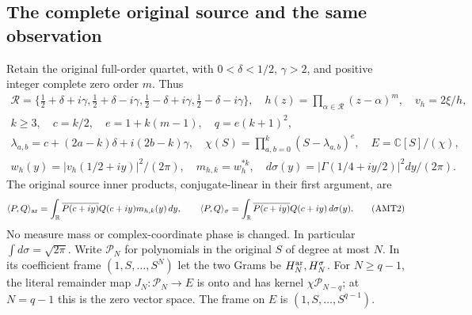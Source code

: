 \documentclass[11pt,a4paper]{article}
\begin{document}
\subsection{The complete original source and the same observation}
Retain the original full-order quartet, with $0<\delta<1/2$,
$\gamma>2$, and positive integer complete zero order $m$. Thus
\[
\begin{gathered}
 \mathcal R=\{\tfrac12+\delta+i\gamma,\tfrac12+\delta-i\gamma,
              \tfrac12-\delta+i\gamma,\tfrac12-\delta-i\gamma\},\quad
 h(z)=\prod_{\alpha\in\mathcal R}(z-\alpha)^m,\quad v_h=2\xi/h,\\
 k\ge3,\quad c=k/2,\quad e=1+k(m-1),\quad q=e(k+1)^2,\\
 \lambda_{a,b}=c+(2a-k)\delta+i(2b-k)\gamma,\quad
 \chi(S)=\prod_{a,b=0}^k(S-\lambda_{a,b})^e,\quad E=\mathbb C[S]/(\chi),\\
 w_h(y)=|v_h(1/2+iy)|^2/(2\pi),\quad m_{h,k}=w_h^{*k},\quad
 d\sigma(y)=|\Gamma(1/4+iy/2)|^2dy/(2\pi).
\end{gathered}\tag{AMT1}
\]
The original source inner products, conjugate-linear in their first
argument, are
\[
 \langle P,Q\rangle_{\rm ar}
  =\int_{\mathbb R}\overline{P(c+iy)}Q(c+iy)m_{h,k}(y)\,dy,
 \qquad
 \langle P,Q\rangle_\sigma
  =\int_{\mathbb R}\overline{P(c+iy)}Q(c+iy)\,d\sigma(y).
 \tag{AMT2}
\]
No measure mass or complex-coordinate phase is changed. In particular
$\int d\sigma=\sqrt{2\pi}$. Write $\mathcal P_N$ for polynomials
in the original $S$ of degree at most $N$. In its coefficient frame
$(1,S,\ldots,S^N)$ let the two Grams be $H_N^{\rm ar},H_N^\sigma$.
For $N\ge q-1$, the literal remainder map
$J_N:\mathcal P_N\to E$ is onto and has kernel
$\chi\mathcal P_{N-q}$; at $N=q-1$ this is the zero vector space.
The frame on $E$ is $(1,S,\ldots,S^{q-1})$.
\end{document}
